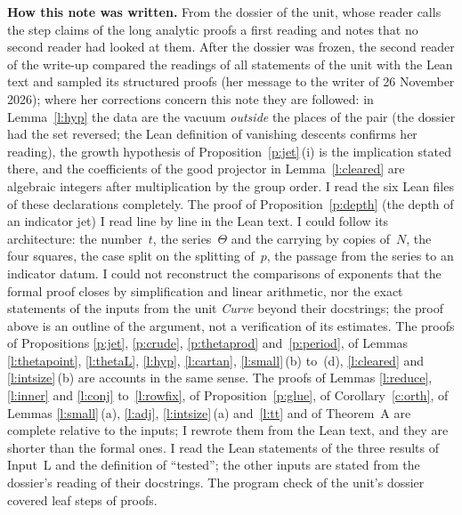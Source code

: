 \documentclass[11pt,a4paper]{article}
\newcommand{\subhead}[1]{\par\addvspace{9pt plus 2pt}\Needspace{4\baselineskip}\noindent\textbf{#1}\enspace\ignorespaces}
\theoremstyle{plainx}
\theoremstyle{uprightx}
\begin{document}
\subhead{How this note was written.} From the dossier of the unit, whose reader calls the step claims of the long
analytic proofs a first reading and notes that no second reader had looked at them. After the dossier was frozen, the second reader of the write-up compared the readings of all statements of the unit
with the Lean text and sampled its structured proofs (her message to the writer of 26 November 2026); where
her corrections concern this note they are followed: in Lemma~\ref{l:hyp} the data are the vacuum \emph{outside} the
places of the pair (the dossier had the set reversed; the Lean definition of vanishing descents confirms her
reading), the growth hypothesis of Proposition~\ref{p:jet}\,(i) is the implication stated there, and the coefficients of
the good projector in Lemma~\ref{l:cleared} are algebraic integers after multiplication by the group order. I read the six Lean files of
these declarations completely. The proof of Proposition~\ref{p:depth} (the depth of an indicator jet) I read line by
line in the Lean text. I could follow its architecture: the number~$t$, the series~$\Theta$ and the carrying by
copies of~$N$, the four squares, the case split on the splitting of~$p$, the passage from the series to an indicator
datum. I could not reconstruct the comparisons of exponents that the formal proof closes by simplification and
linear arithmetic, nor the exact statements of the inputs from the unit \emph{Curve} beyond their docstrings; the
proof above is an outline of the argument, not a verification of its estimates. The proofs of
Propositions \ref{p:jet}, \ref{p:crude}, \ref{p:thetaprod} and~\ref{p:period}, of Lemmas \ref{l:thetapoint},
\ref{l:thetaL}, \ref{l:hyp}, \ref{l:cartan}, \ref{l:small}\,(b) to~(d), \ref{l:cleared} and \ref{l:intsize}\,(b) are
accounts in the same sense. The proofs of Lemmas \ref{l:reduce}, \ref{l:inner} and \ref{l:conj}
to~\ref{l:rowfix}, of Proposition~\ref{p:glue}, of Corollary~\ref{c:orth}, of Lemmas \ref{l:small}\,(a), \ref{l:adj},
\ref{l:intsize}\,(a) and~\ref{l:tt} and of Theorem~A are complete relative to the inputs; I rewrote them from the
Lean text, and they are shorter than the formal ones. I read the
Lean statements of the three results of Input~L and the definition of ``tested''; the other inputs are stated from
the dossier's reading of their docstrings. The program check of the unit's dossier covered \UnitSteps{} leaf steps
of \UnitProofs{} proofs.
\end{document}
